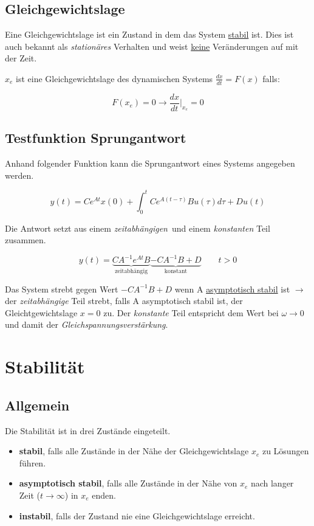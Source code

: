 \documentclass[
  10pt,
  a4paper,
  twocolumn]{article}
\providecommand{\tightlist}{%
  \setlength{\itemsep}{0pt}\setlength{\parskip}{0pt}}\usepackage{longtable,booktabs,array}
\numberwithin{equation}{section}
\begin{document}
\hypertarget{gleichgewichtslage}{%
\subsection{Gleichgewichtslage}\label{gleichgewichtslage}}

Eine Gleichgewichtslage ist ein Zustand in dem das System \ul{stabil}
ist. Dies ist auch bekannt als \emph{stationäres} Verhalten und weist
\ul{keine} Veränderungen auf mit der Zeit.

\(x_e\) ist eine Gleichgewichtslage des dynamischen Systems
\(\frac{dx}{dt}=F(x)\) falls:

\[
F(x_e)=0 \rightarrow \frac{dx}{dt}\biggr\rvert_{x_e}=0
\]

\hypertarget{testfunktion-sprungantwort}{%
\subsection{Testfunktion
Sprungantwort}\label{testfunktion-sprungantwort}}

Anhand folgender Funktion kann die Sprungantwort eines Systems angegeben
werden.

\[
y(t)=Ce^{At}x(0)+\int^t_0Ce^{A(t-\tau)}Bu(\tau)d\tau+Du(t)
\]

Die Antwort setzt aus einem \emph{zeitabhängigen}~und einem
\emph{konstanten} Teil zusammen.

\[
y(t)=\underbrace{CA^{-1}e^{At}B}_{\text{zeitabhängig}}\underbrace{-CA^{-1}B+D}_{\text{konstant}}\qquad t>0
\]

Das System strebt gegen Wert \(-CA^{-1}B+D\) wenn A \ul{asymptotisch
stabil} ist \(\rightarrow\) der \emph{zeitabhängige} Teil strebt, falls
A asymptotisch stabil ist, der Gleichtgewichtslage \(x=0\) zu. Der
\emph{konstante} Teil entspricht dem Wert bei \(\omega\rightarrow 0\)
und damit der \emph{Gleichspannungsverstärkung}.

\hypertarget{stabilituxe4t}{%
\section{Stabilität}\label{stabilituxe4t}}

\hypertarget{allgemein}{%
\subsection{Allgemein}\label{allgemein}}

Die Stabilität ist in drei Zustände eingeteilt.

\begin{itemize}
\tightlist
\item
  \textbf{stabil}, falls alle Zustände in der Nähe der
  Gleichgewichtslage \(x_e\) zu Lösungen führen.
\item
  \textbf{asymptotisch stabil}, falls alle Zustände in der Nähe von
  \(x_e\) nach langer Zeit (\(t \rightarrow \infty\)) in \(x_e\) enden.
\item
  \textbf{instabil}, falls der Zustand nie eine Gleichgewichtslage
  erreicht.
\end{itemize}
\end{document}

